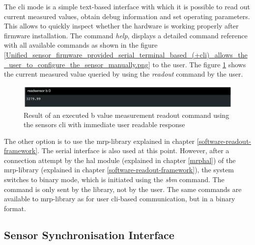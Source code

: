 The \gls{cli} mode is a simple text-based interface with which it is
possible to read out current measured values, obtain debug information
and set operating parameters. This allows to quickly inspect whether the
hardware is working properly after firmware installation. The command
\emph{help}, displays a detailed command reference with all available
commands as shown in the figure
\ref{Unified_sensor_firmware_provided_serial_terminal_based_(+cli)_allows_the_user_to_configure_the_sensor_manually.png}
to the user. The figure
\ref{Result_of_an_executed_b_value_measurement_readout_command_using_the_sensors_(+cli)_with_immediate_user_readable_response.png}
shows the current measured value queried by using the \emph{readout}
command by the user.

\begin{figure}
\centering
\includegraphics{./generated_images/border_Result_of_an_executed_b_value_measurement_readout_command_using_the_sensors_(+cli)_with_immediate_user_readable_response.png}
\caption{Result of an executed b value measurement readout command using
the sensors \gls{cli} with immediate user readable response
\label{Result_of_an_executed_b_value_measurement_readout_command_using_the_sensors_(+cli)_with_immediate_user_readable_response.png}}
\end{figure}

The other option is to use the \gls{mrp}-library explained in chapter
\ref{software-readout-framework}. The serial interface is also used at
this point. However, after a connection attempt by the \gls{hal} module
(explained in chapter \ref{mrphal}) of the \gls{mrp}-library (explained
in chapter \ref{software-readout-framework}), the system switches to
binary mode, which is initiated using the \emph{sbm} command. The
command is only sent by the library, not by the user. The same commands
are available to \gls{mrp}-library as for user \gls{cli}-based
communication, but in a binary format.

\hypertarget{sensor-synchronisation-interface}{%
\subsection{Sensor Synchronisation
Interface}\label{sensor-synchronisation-interface}}

